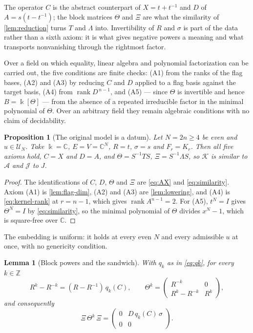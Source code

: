 \documentclass[11pt,reqno]{amsart}
\theoremstyle{plain}
\newtheorem{lemma}[theorem]{Lemma}
\newtheorem{proposition}[theorem]{Proposition}
\theoremstyle{definition}
\theoremstyle{remark}
\numberwithin{equation}{section}
\begin{document}
The operator $C$ is the abstract counterpart of $X=t+t^{-1}$ and $D$ of
$A=s(t-t^{-1})$; the block matrices $\Theta$ and $\Xi$ are what the similarity
of \cref{lem:reduction} turns $T$ and $\Lambda$ into. Invertibility of $R$ and
$\sigma$ is part of the data rather than a sixth axiom: it is what gives
negative powers a meaning and what transports nonvanishing through the
rightmost factor.

Over a field on which equality, linear algebra and polynomial factorization
can be carried out, the five conditions are finite checks: (A1) from the ranks
of the flag bases, (A2) and (A3) by reducing $C$ and $D$ applied to a flag
basis against the target basis, (A4) from $\operatorname{rank}D^{\,n-1}$, and
(A5) --- since $\Theta$ is invertible and hence $B=\Bbbk[\Theta]$ --- from the
absence of a repeated irreducible factor in the minimal polynomial of $\Theta$.
Over an arbitrary field they remain algebraic conditions with no claim of
decidability.

\begin{proposition}[The original model is a datum]
\label{prop:embedding}
Let $N=2n\ge4$ be even and $u\in\mathcal{U}_{N}$. Take $\Bbbk=\mathbb{C}$,
$E=V=\mathbb{C}^{N}$, $R=t$, $\sigma=s$ and $F_{r}=K_{r}$. Then all five
axioms hold, $C=X$ and $D=A$, and $\Theta=S^{-1}TS$, $\Xi=S^{-1}\Lambda S$, so
$\mathcal{K}$ is similar to $\mathcal{A}$ and $\mathcal{J}$ to $J$.
\end{proposition}

\begin{proof}
The identifications of $C$, $D$, $\Theta$ and $\Xi$ are \cref{eq:AX} and
\cref{eq:similarity}. Axiom (A1) is \cref{lem:flag-dim}, (A2) and (A3) are
\cref{lem:lowering}, and (A4) is \cref{eq:kernel-rank} at $r=n-1$, which gives
$\operatorname{rank}A^{n-1}=2$. For (A5), $t^{N}=I$ gives $\Theta^{N}=I$ by
\cref{eq:similarity}, so the minimal polynomial of $\Theta$ divides $x^{N}-1$,
which is square-free over $\mathbb{C}$.
\end{proof}

The embedding is uniform: it holds at every even $N$ and every admissible $u$
at once, with no genericity condition.

\begin{lemma}[Block powers and the sandwich]
\label{lem:blocks}
With $q_{k}$ as in \cref{eq:qk}, for every $k\in\mathbb{Z}$
\begin{equation*}
  R^{k}-R^{-k}=(R-R^{-1})\,q_{k}(C),
  \qquad
  \Theta^{k}=\begin{pmatrix}R^{-k}&0\\R^{k}-R^{-k}&R^{k}\end{pmatrix},
\end{equation*}
and consequently
\begin{equation}
  \Xi\,\Theta^{k}\,\Xi=\begin{pmatrix}0&D\,q_{k}(C)\,\sigma\\0&0\end{pmatrix}.
  \label{eq:sandwich}
\end{equation}
\end{lemma}
\end{document}
